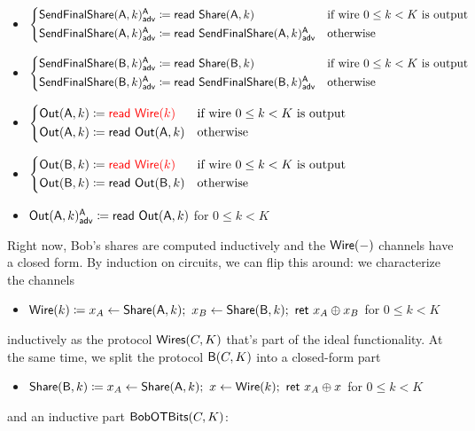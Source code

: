 \begin{itemize}
\item {\color{blue} $\begin{cases*} \LeakSendFinalShare(\A,k)^\A_\adv \coloneqq \read{\Share(\A,k)} & \text{if wire $0 \leq k < K$ is output} \\ \LeakSendFinalShare(\A,k)^\A_\adv \coloneqq \read{\LeakSendFinalShare(\A,k)^\A_\adv} & \text{otherwise} \end{cases*}$}
\item {\color{blue} $\begin{cases*} \LeakSendFinalShare(\B,k)^\A_\adv \coloneqq \read{\Share(\B,k)} & \text{if wire $0 \leq k < K$ is output} \\ \LeakSendFinalShare(\B,k)^\A_\adv \coloneqq \read{\LeakSendFinalShare(\B,k)^\A_\adv} & \text{otherwise} \end{cases*}$}
\item $\begin{cases*} \Out(\A,k) \coloneqq {\color{red} \read{\Wire(k)}} & \text{if wire $0 \leq k < K$ is output} \\ \Out(\A,k) \coloneqq \read{\Out(\A,k)} & \text{otherwise} \end{cases*}$
\item $\begin{cases*} \Out(\B,k) \coloneqq {\color{red} \read{\Wire(k)}} & \text{if wire $0 \leq k < K$ is output} \\ \Out(\B,k) \coloneqq \read{\Out(\B,k)} & \text{otherwise} \end{cases*}$
\item {\color{blue} $\mathsf{Out}(\mathsf{A},k)^{\mathsf{A}}_{\mathsf{adv}} \coloneqq \mathsf{read} \ \mathsf{Out}(\mathsf{A},k)$ for $0 \leq k < K$}
\end{itemize}

\noindent Right now, Bob's shares are computed inductively and the $\mathsf{Wire}(-)$ channels have a closed form. By induction on circuits, we can flip this around: we characterize the channels
\begin{itemize}
\item $\mathsf{Wire}(k) \coloneqq x_A \leftarrow \mathsf{Share}(\mathsf{A},k); \ x_B \leftarrow \mathsf{Share}(\mathsf{B},k); \ \mathsf{ret} \ x_A \oplus x_B$ for $0 \leq k < K$
\end{itemize}
inductively as the protocol $\mathsf{Wires}(C,K)$ that's part of the ideal functionality. At the same time, we split the protocol $\mathsf{B}(C,K)$ into a closed-form part
\begin{itemize}
\item $\mathsf{Share}(\mathsf{B},k) \coloneqq x_A \leftarrow \mathsf{Share}(\mathsf{A},k); \ x \leftarrow \mathsf{Wire}(k); \ \mathsf{ret} \ x_A \oplus x$ for $0 \leq k < K$
\end{itemize}
and an inductive part $\mathsf{BobOTBits}(C,K)$:

